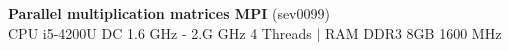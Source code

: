 \documentclass[11pt]{article}
\begin{document}
\pagestyle{empty}
\begin{center}
\textbf{\huge{Parallel multiplication matrices MPI}} \Large{(sev0099)} \\
\LARGE{CPU i5-4200U DC 1.6 GHz - 2.G GHz 4 Threads $|$ RAM DDR3 8GB 1600 MHz}
\end{center}

\begin{table}[H]
\centering

\end{table}

\begin{table}[H]
\centering

\end{table}
\end{document}
